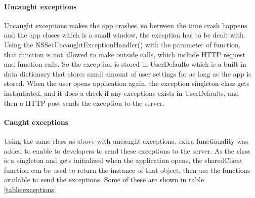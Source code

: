 \paragraph{Uncaught exceptions}

Uncaught exceptions makes the app crashes, so between the time crash happens and the app closes which is a small window, the exception has to be dealt with. Using the NSSetUncaughtExceptionHandler() with the parameter of function, that function is not allowed to make outside calls, which include HTTP request and function calls. So the exception is stored in UserDefaults which is a built in data dictionary that stores small amount of user settings for as long as the app is stored. When the user opens application again, the exception singleton class gets instantiated, and it does a check if any exceptions exists in UserDefaults, and then a HTTP post sends the exception to the server.

\paragraph{Caught exceptions}

Using the same class as above with uncaught exceptions, extra functionality was added to enable to developers to send these exceptions to the server. As the class is a singleton and gets initialized when the application opens, the sharedClient function can be used to return the instance of that object, then use the functions available to send the exceptions.
Some of these are shown in table \ref{table:exceptions}

